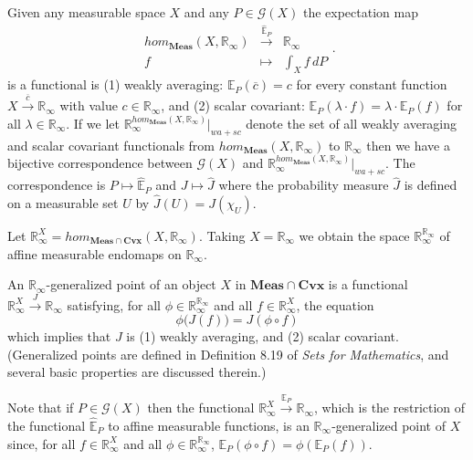 \documentclass[11pt]{amsart}    %
\newcommand{\Rinf}{\mathbb{R}_{\infty}}
\newcommand{\be}{\begin{equation}}
\newcommand{\ee}{\end{equation}}
\newcommand{\G}{\mathcal{G}}
\begin{document}
Given any measurable space $X$ and any $P \in \G(X)$ the expectation map
\be \nonumber
\begin{array}{ccc}
hom_{\mathbf{Meas}}(X, \mathbb{R}_{\infty}) &\xrightarrow{\hat{\mathbb{E}}_{P}}&  \Rinf \\
f & \mapsto &  \int_X f \, dP
\end{array}.
\ee
 is a functional is   (1) weakly averaging:  $\mathbb{E}_{P}(\overline{c}) = c$ for every constant function $X \xrightarrow{\overline{c}} \Rinf$ with value $c \in\Rinf$, and (2) scalar covariant: $\mathbb{E}_P(\lambda \cdot f) = \lambda \cdot  \mathbb{E}_P(f)$ for all $\lambda \in \Rinf$. 
 If we let $\mathbb{R}_{\infty}^{hom_{\mathbf{Meas}}(X,\mathbb{R}_{\infty})}|_{wa+sc}$ denote the set of all weakly averaging and scalar covariant functionals from $hom_{\mathbf{Meas}}(X, \mathbb{R}_{\infty})$  to $\mathbb{R}_{\infty}$ then we have a bijective    correspondence between  $\G(X)$ and $\mathbb{R}_{\infty}^{hom_{\mathbf{Meas}}(X,\mathbb{R}_{\infty})}|_{wa+sc}$. The correspondence is $P \mapsto \hat{\mathbb{E}}_{P}$ and $J \mapsto \hat{J}$ where the probability measure $\hat{J}$ is defined on a measurable set $U$ by $\hat{J}(U) = J(\chi_U)$.                                                          

Let $\mathbb{R}_{\infty}^X = hom_{\mathbf{Meas} \cap \mathbf{Cvx}}(X, \mathbb{R}_{\infty})$. Taking $X=\mathbb{R}_{\infty}$ we obtain the space $\mathbb{R}_{\infty}^{\mathbb{R}_{\infty}}$ of affine measurable endomaps on $\mathbb{R}_{\infty}$.

 An $\mathbb{R}_{\infty}$-generalized point of an object $X$ in $\mathbf{Meas} \cap \mathbf{Cvx}$ is a functional $\mathbb{R}_{\infty}^X \xrightarrow{J} \mathbb{R}_{\infty}$ satisfying, for all $\phi \in \mathbb{R}_{\infty}^{\mathbb{R}_{\infty}}$ and all $f \in \mathbb{R}_{\infty}^X$, the equation 
\begin{equation}
\phi \big( J(f) \big) = J(\phi \circ f)
\end{equation}
which implies that $J$ is (1) weakly averaging, and (2) scalar covariant.
(Generalized points are defined in Definition 8.19 of \textit{Sets for Mathematics}\cite{SFM}, and several basic properties are discussed therein.)

Note that if $P \in \G(X)$ then the functional $\mathbb{R}_{\infty}^X \xrightarrow{\mathbb{E}_P} \mathbb{R}_{\infty}$, which is the restriction of the functional $\hat{ \mathbb{E}}_P$ to affine measurable functions, is an $\Rinf$-generalized point of $X$ since, for all $f \in \mathbb{R}_{\infty}^X$ and all $\phi \in \mathbb{R}_{\infty}^{ \mathbb{R}_{\infty}}$, 
$\mathbb{E}_P(\phi \circ f) = \phi( \mathbb{E}_P(f) )$.
\end{document}
